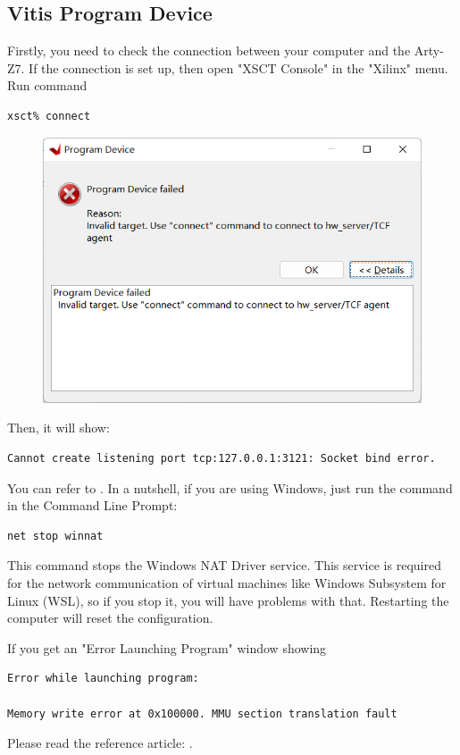 \documentclass[a4paper,12pt,twoside]{article}
\begin{document}
\subsection{Vitis Program Device}\label{AA4}
Firstly, you need to check the connection between your computer and the Arty-Z7. If the connection is set up, then open "XSCT Console" in the "Xilinx" menu. Run command \cite{vitisprogram}
\begin{verbatim}
xsct% connect
\end{verbatim}
\begin{figure}[H]
    \centering
    \includegraphics[width=\textwidth]{images/18.png}
\end{figure}
Then, it will show:
\begin{verbatim}
Cannot create listening port tcp:127.0.0.1:3121: Socket bind error.
\end{verbatim}

You can refer to \cite{vitissocket}. In a nutshell, if you are using Windows, just run the command in the Command Line Prompt:
\begin{verbatim}
net stop winnat
\end{verbatim}
This command stops the Windows NAT Driver service. This service is required for the network communication of virtual machines like Windows Subsystem for Linux (WSL), so if you stop it, you will have problems with that. Restarting the computer will reset the configuration.

If you get an "Error Launching Program" window showing
\begin{verbatim}
Error while launching program:

Memory write error at 0x100000. MMU section translation fault
\end{verbatim}
Please read the reference article: \cite{vitisarty}.
\end{document}
